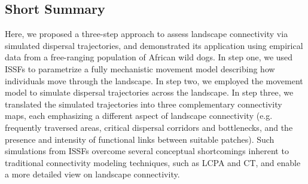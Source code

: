 \documentclass[abstract=on,10pt,a4paper,bibliography=totocnumbered]{article}
\begin{document}
\subsection{Short Summary}
Here, we proposed a three-step approach to assess landscape connectivity via
simulated dispersal trajectories, and demonstrated its application using
empirical data from a free-ranging population of African wild dogs. In step one,
we used ISSFs to parametrize a fully mechanistic movement model describing how
individuals move through the landscape. In step two, we employed the movement
model to simulate dispersal trajectories across the landscape. In step three, we
translated the simulated trajectories into three complementary connectivity
maps, each emphasizing a different aspect of landscape connectivity (e.g.
frequently traversed areas, critical dispersal corridors and bottlenecks, and
the presence and intensity of functional links between suitable patches). Such
simulations from ISSFs overcome several conceptual shortcomings inherent to
traditional connectivity modeling techniques, such as LCPA and CT, and enable a
more detailed view on landscape connectivity.

\end{document}
